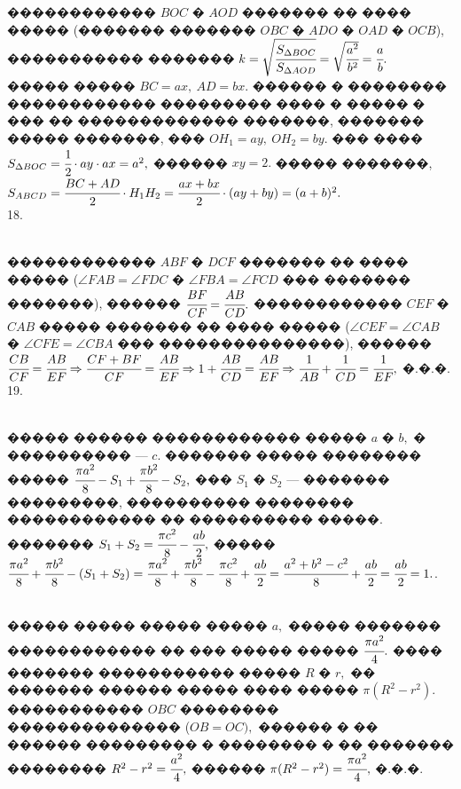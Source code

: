 \documentclass[12pt]{article}
\begin{document}
������������ $BOC$ � $AOD$ ������� �� ���� ����� (������� ������� $OBC$ � $ADO$ � $OAD$ � $OCB$), ����������� ������� $k=\sqrt{\cfrac{S_{\Delta BOC}}{S_{\Delta AOD}}}=\sqrt{\cfrac{a^2}{b^2}}=\cfrac{a}{b}.$ ����� ����� $BC=ax,\ AD=bx.$ ������ � �������� ������������ ��������� ���� � ����� � ��� �� ������������� �������, ������� ����� �������, ��� $OH_1=ay,\ OH_2=by.$ ��� ���� $S_{\Delta BOC}=\cfrac{1}{2}\cdot ay\cdot ax=a^2,$ ������ $xy=2.$ ����� �������, $S_{ABCD}=\cfrac{BC+AD}{2}\cdot H_1H_2=\cfrac{ax+bx}{2}\cdot(ay+by)=(a+b)^2.$\\
18. \begin{figure}[ht!]
\end{figure}\\
������������ $ABF$ � $DCF$ ������� �� ���� ����� ($\angle FAB=\angle FDC$ � $\angle FBA=\angle FCD$ ��� ������� �������), ������ $\cfrac{BF}{CF}=\cfrac{AB}{CD}.$ ������������ $CEF$ � $CAB$ ����� ������� �� ���� ����� ($\angle CEF=\angle CAB$ � $\angle CFE=\angle CBA$ ��� ���������������), ������ $\cfrac{CB}{CF}=\cfrac{AB}{EF}\Rightarrow \cfrac{CF+BF}{CF}=\cfrac{AB}{EF}\Rightarrow 1+\cfrac{AB}{CD}=\cfrac{AB}{EF}
\Rightarrow \cfrac{1}{AB}+\cfrac{1}{CD}=\cfrac{1}{EF},$ �.�.�.\\
19. \begin{figure}[ht!]
\end{figure}\\
����� ������ ������������ ����� $a$ � $b,$ � ���������� --- $c.$ ������� ����� �������� ����� $\cfrac{\pi a^2}{8}-S_1+\cfrac{\pi b^2}{8}-S_2,$ ��� $S_1$ � $S_2$ --- ������� ���������, ���������� �������� ������������ �� ���������� �����. ������� $S_1+S_2=\cfrac{\pi c^2}{8}-\cfrac{ab}{2},$ �����
$\cfrac{\pi a^2}{8}+\cfrac{\pi b^2}{8}-(S_1+S_2)=\cfrac{\pi a^2}{8}+\cfrac{\pi b^2}{8}-\cfrac{\pi c^2}{8}+\cfrac{ab}{2}=\cfrac{a^2+b^2-c^2}{8}+\cfrac{ab}{2}=
\cfrac{ab}{2}=1.$\newpage{}. \begin{figure}[ht!]
\end{figure}\\
����� ����� ����� ����� $a,$ ����� ������� ������������ �� ��� ����� ����� $\cfrac{\pi a^2}{4}.$ ���� ������� ����������� ����� $R$ � $r,$ �� ������� ������ ����� ���� ����� $\pi(R^2-r^2).$ ����������� $OBC$ �������� �������������� ($OB=OC),$ ������ � �� ������ ��������� � �������� � �� ������� �������� $R^2-r^2=\cfrac{a^2}{4},$ ������ $\pi(R^2-r^2)=\cfrac{\pi a^2}{4},$ �.�.�.\\
\end{document}
